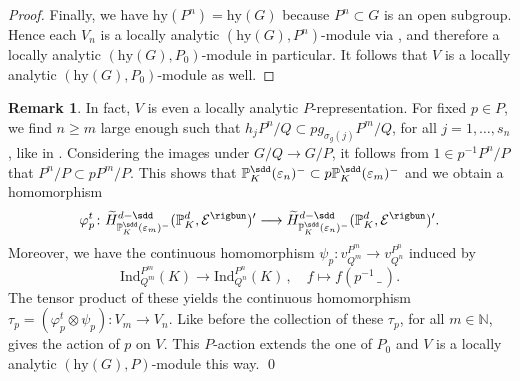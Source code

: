 \documentclass[a4paper, reqno, 10pt]{amsart}
\theoremstyle{definition}
\newtheorem{remark}[theorem]{Remark}
\numberwithin{equation}{section}
\newcommand{\blank}{{\,\_\,}}
\newcommand{\hy}{{\mathrm{hy}}}
\newcommand{\Ind}{{\mathrm{Ind}}}
\newcommand{\lra}{\longrightarrow}
\newcommand{\lto}{\longmapsto}
\newcommand{\ra}{\rightarrow}
\newcommand{\BN}{{\mathbb {N}}}
\newcommand{\BP}{{\mathbb {P}}}
\newcommand{\CE}{{\mathcal {E}}}
\begin{document}
\begin{proof}
	
	Finally, we have $\hy(P^n) = \hy(G)$ because $P^n\subset G$ is an open subgroup.	
	Hence each $V_n$ is a locally analytic $(\hy(G),P^n)$-module via , and therefore a locally analytic $(\hy(G),P_0)$-module in particular.
	It follows that $V$ is a locally analytic $(\hy(G),P_0)$-module as well.	
\end{proof}


\begin{remark}\label{Rmk 3 - P-action on inductive limit}
	In fact, $V$ is even a locally analytic $P$-representation.
	For fixed $p\in P$, we find $n\geq m$ large enough such that $h_j P^n/Q \subset p g_{\sigma_g(j)} P^m/Q$, for all $j=1,\ldots, s_n$, like in .
	Considering the images under $G/Q \ra G/P$, it follows from $1 \in p^{-1} P^n/P $ that $P^n/P \subset p P^m/P$.
	This shows that $\BP_K^\sdd (\varepsilon_n)^- \subset p \BP_K^\sdd(\varepsilon_m)^-$ and we obtain a homomorphism
	\begin{equation*}
		\varphi_p^t \colon \widetilde{H}^{d-\sdd}_{\BP_K^\sdd(\varepsilon_m)^-} (\BP_K^d, \CE^\rigbun)' \lra \widetilde{H}^{d-\sdd}_{\BP_K^\sdd(\varepsilon_n)^-} (\BP_K^d, \CE^\rigbun)' .
	\end{equation*}
	Moreover, we have the continuous homomorphism $\psi_p\colon v^{P^m}_{Q^m} \ra v^{P^n}_{Q^n}$ induced by
	\begin{equation*}
		\Ind^{P^m}_{Q^m} (K) \lra \Ind^{P^n}_{Q^n} (K) \,,\quad f \lto f(p^{-1} \blank ) .
	\end{equation*}
	The tensor product of these yields the continuous homomorphism $\tau_p = (\varphi_p^t \otimes \psi_p) \colon V_m \ra V_n$.
	Like before the collection of these $\tau_p$, for all $m \in \BN$, gives the action of $p$ on $V$.
	This $P$-action extends the one of $P_0$ and $V$ is a locally analytic $(\hy(G),P)$-module this way.
	\qed
\end{remark}
\end{document}
